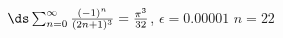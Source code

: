 {$\ds \sum_{n=0}^\infty \frac{(-1)^{n}}{(2n+1)^3}=\frac{\pi^3}{32}$, \quad $\epsilon = 0.00001$
}
{$n=22$
}